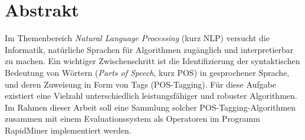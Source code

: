 %
\chapter*{Abstrakt}
\label{sec:abstract}
\vspace*{-10mm}

Im Themenbereich \textit{Natural Language Processing} (kurz NLP) versucht die Informatik, natürliche Sprachen für Algorithmen zugänglich und interpretierbar zu machen. Ein wichtiger Zwischenschritt ist die Identifizierung der syntaktischen Bedeutung von Wörtern (\textit{Parts of Speech}, kurz POS) in gesprochener Sprache, und deren Zuweisung in Form von Tags (POS-Tagging). Für diese Aufgabe existiert eine Vielzahl unterschiedlich leistungsfähiger und robuster Algorithmen.
\newline
Im Rahmen dieser Arbeit soll eine Sammlung solcher POS-Tagging-Algorithmen zusammen mit einem Evaluationssystem als Operatoren im Programm RapidMiner implementiert werden.


